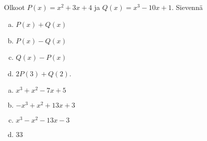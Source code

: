 \begin{tehtava}
    Olkoot $P(x)=x^2+3x+4$ ja $Q(x)=x^3-10x+1$. Sievennä
    \begin{enumerate}[a)]
        \item $P(x)+Q(x)$
        \item $P(x)-Q(x)$
        \item $Q(x)-P(x)$
        \item $2P(3)+Q(2)$.
    \end{enumerate}
    \begin{vastaus}
        \begin{enumerate}[a)]
            \item $x^3+x^2-7x+5$ %
            \item $-x^3+x^2+13x+3$ %
            \item $x^3-x^2-13x-3$ %
            \item $33$ %
        \end{enumerate}
    \end{vastaus}
\end{tehtava}

%

%

